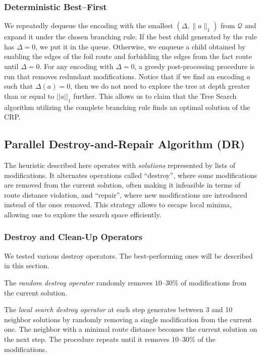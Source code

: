 \documentclass{article}
\begin{document}
\subsubsection{Deterministic Best–First}
We repeatedly dequeue the encoding with the smallest $(\Delta,\|a\|_1)$ from $\mathcal Q$ and expand it under the chosen branching rule.  
If the best child generated by the rule has $\Delta = 0$, we put it in the queue. 
Otherwise, we enqueue a child obtained by enabling the edges of the foil route and forbidding the edges from the fact route until $\Delta=0$.  
For any encoding with $\Delta=0$, a greedy post-processing procedure is run that removes redundant modifications.  
Notice that if we find an encoding $a$ such that $\Delta(a) = 0$, then we do not need to explore the tree at depth greater than or equal to $||a||_1$ further.
This allows us to claim that the Tree Search algorithm utilizing the complete branching rule finds an optimal solution of the CRP.

\subsection{Parallel Destroy-and-Repair Algorithm (DR)}
The heuristic described here operates with \textit{solutions} represented by lists of modifications.  
It alternates operations called ``destroy'', where some modifications are removed from the current solution, often making it infeasible in terms of route distance violation, and ``repair'', where new modifications are introduced instead of the ones removed.
This strategy allows to escape local minima, allowing one to explore the search space efficiently. 

\subsubsection{Destroy and Clean-Up Operators}
We tested various destroy operators. 
The best-performing ones will be described in this section.

The \textit{random destroy operator} randomly removes $10$--$30\%$ of modifications from the current solution. 

The \textit{local search destroy operator} at each step generates between 3 and 10 neighbor solutions by randomly removing a single modification from the current one. 
The neighbor with a minimal route distance becomes the current solution on the next step. 
The procedure repeats until it removes $10$--$30\%$ of the modifications. 
\end{document}
